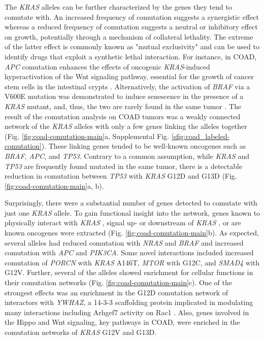\documentclass[english, 12pt, letterpaper]{article}
\newcommand{\KRAS}{\emph{KRAS}}
\begin{document}
The \KRAS{} alleles can be further characterized by the genes they tend to comutate with.
An increased frequency of comutation suggests a synergistic effect whereas a reduced frequency of comutation suggests a neutral or inhibitory effect on growth, potentially through a mechanism of collateral lethality.
The extreme of the latter effect is commonly known as "mutual exclusivity" and can be used to identify drugs that exploit a synthetic lethal interaction.
For instance, in COAD, \emph{APC} comutation enhances the effects of oncogenic \KRAS{}-induced hyperactivation of the Wnt signaling pathway, essential for the growth of cancer stem cells in the intestinal crypts \cite{Janssen2006, Fearon2014, Sakai2018, Jauhri2017}.
Alternatively, the activation of \emph{BRAF} via a V600E mutation was demonstrated to induce senescence in the presence of a \KRAS{} mutant, and, thus, the two are rarely found in the same tumor \cite{Seth2009ConcomitantCancer., Cisowski2016, Jauhri2017}.
The result of the comutation analysis on COAD tumors was a weakly connected network of the \KRAS{} alleles with only a few genes linking the alleles together (Fig. \ref{fig:coad-comutation-main}a, Supplemental Fig. \ref{sfig:coad_labeled-comutation}).
These linking genes tended to be well-known oncogenes such as \emph{BRAF}, \emph{APC}, and \emph{TP53}.
Contrary to a common assumption, while \KRAS{} and \emph{TP53} are frequently found mutated in the same tumor, there is a detectable reduction in comutation between \emph{TP53} with \KRAS{} G12D and G13D (Fig. \ref{fig:coad-comutation-main}a, b).

Surprisingly, there were a substantial number of genes detected to comutate with just one \KRAS{} allele.
To gain functional insight into the network, genes known to physically interact with \KRAS{} \cite{Kovalski2019}, signal up- or downstream of \KRAS{} \cite{Kanehisa2017, Kanehisa2016KEGGAnnotation.}, or are known oncogenes \cite{Bamford2004TheWebsite., Sondka2018} were extracted (Fig. \ref{fig:coad-comutation-main}b).
As expected, several alleles had reduced comutation with \emph{NRAS} and \emph{BRAF} and increased comutation with \emph{APC} and \emph{PIK3CA}. Some novel interactions included increased comutation of \emph{PORCN} with \KRAS{} A146T, \emph{MTOR} with G12C, and \emph{SMAD4} with G12V.
Further, several of the alleles showed enrichment for cellular functions in their comutation networks (Fig. \ref{fig:coad-comutation-main}c).
One of the strongest effects was an enrichment in the G12D comutation network of interactors with \emph{YWHAZ}, a 14-3-3 scaffolding protein implicated in modulating many interactions including Arhgef7 activity on Rac1 \cite{Angrand2006TransgenicSignaling.}.
Also, genes involved in the Hippo and Wnt signaling, key pathways in COAD, were enriched in the comutation networks of \KRAS{} G12V and G13D.
\end{document}
